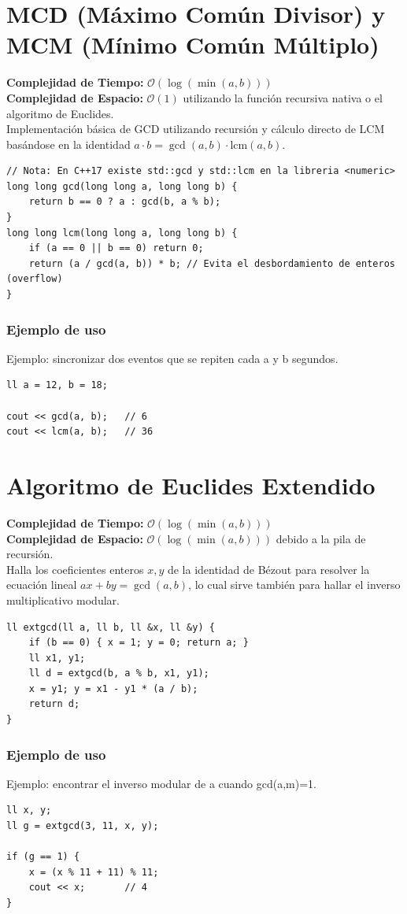 \documentclass[10pt,twocolumn,letterpaper]{report}
\begin{document}
\section{MCD (Máximo Común Divisor) y MCM (Mínimo Común Múltiplo)}
\textbf{Complejidad de Tiempo:} $\mathcal{O}(\log(\min(a, b)))$ \\
\textbf{Complejidad de Espacio:} $\mathcal{O}(1)$ utilizando la función recursiva nativa o el algoritmo de Euclides. \\
Implementación básica de GCD utilizando recursión y cálculo directo de LCM basándose en la identidad $a \cdot b = \gcd(a, b) \cdot \text{lcm}(a, b)$.
\begin{lstlisting}
// Nota: En C++17 existe std::gcd y std::lcm en la libreria <numeric>
long long gcd(long long a, long long b) {
    return b == 0 ? a : gcd(b, a % b);
}
long long lcm(long long a, long long b) {
    if (a == 0 || b == 0) return 0;
    return (a / gcd(a, b)) * b; // Evita el desbordamiento de enteros (overflow)
}
\end{lstlisting}
\subsubsection*{Ejemplo de uso}
Ejemplo: sincronizar dos eventos que se repiten cada a y b segundos.
\begin{lstlisting}
ll a = 12, b = 18;

cout << gcd(a, b);   // 6
cout << lcm(a, b);   // 36
\end{lstlisting}

\section{Algoritmo de Euclides Extendido}
\textbf{Complejidad de Tiempo:} $\mathcal{O}(\log(\min(a, b)))$ \\
\textbf{Complejidad de Espacio:} $\mathcal{O}(\log(\min(a, b)))$ debido a la pila de recursión. \\
Halla los coeficientes enteros $x, y$ de la identidad de Bézout para resolver la ecuación lineal $ax + by = \gcd(a, b)$, lo cual sirve también para hallar el inverso multiplicativo modular.
\begin{lstlisting}
ll extgcd(ll a, ll b, ll &x, ll &y) {
    if (b == 0) { x = 1; y = 0; return a; }
    ll x1, y1;
    ll d = extgcd(b, a % b, x1, y1);
    x = y1; y = x1 - y1 * (a / b);
    return d;
}
\end{lstlisting}
\subsubsection*{Ejemplo de uso}
Ejemplo: encontrar el inverso modular de a cuando gcd(a,m)=1.
\begin{lstlisting}
ll x, y;
ll g = extgcd(3, 11, x, y);

if (g == 1) {
    x = (x % 11 + 11) % 11;
    cout << x;       // 4
}
\end{lstlisting}
\end{document}
